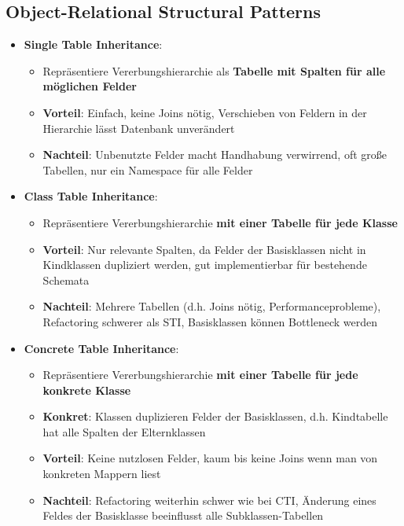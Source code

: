 \subsection{Object-Relational Structural Patterns}
\label{eap:sub:object_relational_structural_patterns}


\begin{itemize}
	\item \textbf{Single Table Inheritance}:
	\begin{itemize}
		\item Repräsentiere Vererbungshierarchie als \textbf{Tabelle mit Spalten für alle möglichen Felder}
		\item \textbf{Vorteil}: Einfach, keine Joins nötig, Verschieben von Feldern in der Hierarchie lässt Datenbank unverändert
		\item \textbf{Nachteil}: Unbenutzte Felder macht Handhabung verwirrend, oft große Tabellen, nur ein Namespace für alle Felder
	\end{itemize}
	\item \textbf{Class Table Inheritance}:
	\begin{itemize}
		\item Repräsentiere Vererbungshierarchie \textbf{mit einer Tabelle für jede Klasse}
		\item \textbf{Vorteil}: Nur relevante Spalten, da Felder der Basisklassen nicht in Kindklassen dupliziert werden, gut implementierbar für bestehende Schemata
		\item \textbf{Nachteil}: Mehrere Tabellen (d.h. Joins nötig, Performanceprobleme), Refactoring schwerer als STI, Basisklassen können Bottleneck werden
	\end{itemize}
	\item \textbf{Concrete Table Inheritance}:
	\begin{itemize}
		\item Repräsentiere Vererbungshierarchie \textbf{mit einer Tabelle für jede konkrete Klasse}
		\item \textbf{Konkret}: Klassen duplizieren Felder der Basisklassen, d.h. Kindtabelle hat alle Spalten der Elternklassen
		\item \textbf{Vorteil}: Keine nutzlosen Felder, kaum bis keine Joins wenn man von konkreten Mappern liest
		\item \textbf{Nachteil}: Refactoring weiterhin schwer wie bei CTI, Änderung eines Feldes der Basisklasse beeinflusst alle Subklassen-Tabellen
	\end{itemize}
\end{itemize}